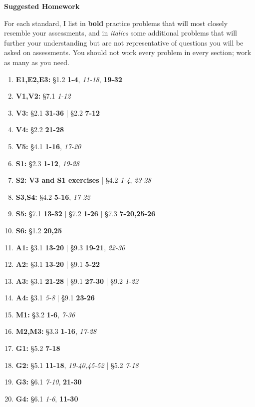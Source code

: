\documentclass{article}
\begin{document}
\begin{center}
\Large \textbf{Suggested Homework}
\end{center}

\newcommand{\closeExamples}{\textbf}
\newcommand{\otherExamples}{\textit}
\newcommand{\standards}[1]{\item[\textbf{#1}]}

For each standard, I list in \closeExamples{bold} practice problems that will most closely resemble your assessments, and in \otherExamples{italics} some additional problems that will further your understanding but are not representative of questions you will be asked on assessments.  You should not work every problem in every section; work as many as you need.

\begin{enumerate}
  \standards{E1,E2,E3:} \S 1.2
    \closeExamples{1-4},
    \otherExamples{11-18},
    \closeExamples{19-32}


  \standards{V1,V2:} \S 7.1
    \otherExamples{1-12}

  \standards{V3:} \S 2.1
    \closeExamples{31-36}
    | \S 2.2
    \closeExamples{7-12}

  \standards{V4:} \S 2.2
    \closeExamples{21-28}

  \standards{V5:} \S 4.1
    \closeExamples{1-16},
    \otherExamples{17-20}

  \standards{S1:} \S 2.3
    \closeExamples{1-12},
    \otherExamples{19-28}

  \standards{S2:}
    \closeExamples{\textbf{V3} and \textbf{S1} exercises}
    | \S 4.2
    \otherExamples{1-4},
    \otherExamples{23-28}

  \standards{S3,S4:} \S 4.2
    \closeExamples{5-16},
    \otherExamples{17-22}

   \standards{S5:} \S 7.1 \closeExamples{13-32} | \S 7.2 \closeExamples{1-26} | \S 7.3 \closeExamples{7-20,25-26}

   \standards{S6:} \S 1.2 \closeExamples{20,25}

  \standards{A1:} \S 3.1 \closeExamples{13-20} | \S 9.3 \closeExamples{19-21}, \otherExamples{22-30}
  \standards{A2:} \S 3.1 \closeExamples{13-20} | \S 9.1 \closeExamples{5-22}
  \standards{A3:} \S 3.1 \closeExamples{21-28} | \S 9.1 \closeExamples{27-30} | \S 9.2 \otherExamples{1-22}
  \standards{A4:} \S 3.1 \otherExamples{5-8} | \S 9.1 \closeExamples{23-26}
  \standards{M1:} \S 3.2 \closeExamples{1-6}, \otherExamples{7-36}
  \standards{M2,M3:} \S 3.3 \closeExamples{1-16}, \otherExamples{17-28}
  \standards{G1:} \S 5.2 \closeExamples{7-18}
  \standards{G2:} \S 5.1 \closeExamples{11-18}, \otherExamples{19-40,45-52} | \S 5.2 \otherExamples{7-18}
  \standards{G3:} \S 6.1 \otherExamples{7-10}, \closeExamples{21-30}
  \standards{G4:} \S 6.1 \otherExamples{1-6}, \closeExamples{11-30}
\end{enumerate}
\end{document}
